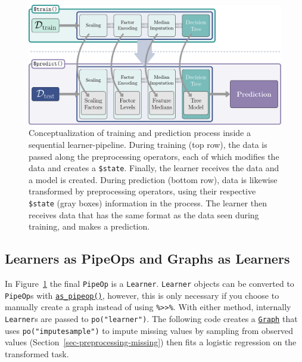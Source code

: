 \begin{figure}

{\centering \includegraphics[width=1\textwidth,height=\textheight]{chapters/chapter7/Figures/mlr3book_figures-22.png}

}

\caption{\label{fig-pipelines-pipeline}Conceptualization of training and
prediction process inside a sequential learner-pipeline. During training
(top row), the data is passed along the preprocessing operators, each of
which modifies the data and creates a \texttt{\$state}. Finally, the
learner receives the data and a model is created. During prediction
(bottom row), data is likewise transformed by preprocessing operators,
using their respective \texttt{\$state} (gray boxes) information in the
process. The learner then receives data that has the same format as the
data seen during training, and makes a prediction.}

\end{figure}

\hypertarget{learners-as-pipeops-and-graphs-as-learners}{%
\subsection{Learners as PipeOps and Graphs as
Learners}\label{learners-as-pipeops-and-graphs-as-learners}}

In Figure~\ref{fig-pipelines-pipeline} the final \texttt{PipeOp} is a
\texttt{Learner}. \texttt{Learner} objects can be converted to
\texttt{PipeOp}s with
\href{https://mlr3pipelines.mlr-org.com/reference/as_pipeop.html}{\texttt{as\_pipeop()}},
however, this is only necessary if you choose to manually create a graph
instead of using \texttt{\%\textgreater{}\textgreater{}\%}. With either
method, internally \texttt{Learner}s are passed to
\texttt{po("learner")}. The following code creates a
\href{https://mlr3pipelines.mlr-org.com/reference/Graph.html}{\texttt{Graph}}
that uses \texttt{po("imputesample")} to impute
missing values by sampling from observed values
(Section~\ref{sec-preprocessing-missing}) then fits a logistic
regression on the transformed task.

